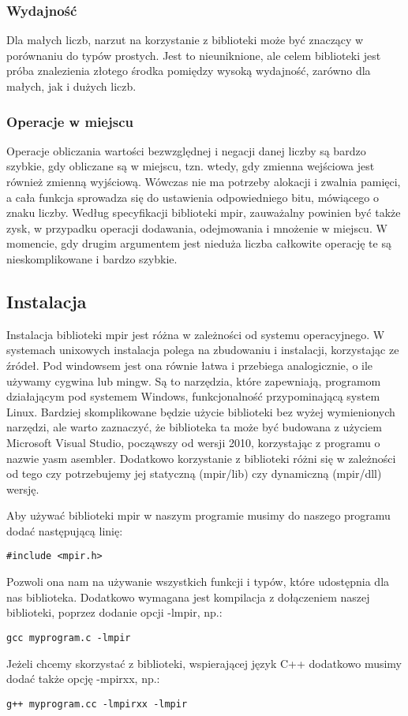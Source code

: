 \documentclass[twoside,a4paper]{book}
\begin{document}
\subsubsection{Wydajność}
Dla małych liczb, narzut na korzystanie z biblioteki może być znaczący w porównaniu do typów prostych. Jest to nieuniknione, ale celem biblioteki jest próba znalezienia złotego środka pomiędzy wysoką wydajność, zarówno dla małych, jak i dużych liczb. 

\subsubsection{Operacje w miejscu}
Operacje obliczania wartości bezwzględnej i negacji danej liczby są bardzo szybkie, gdy obliczane są w miejscu, tzn. wtedy, gdy zmienna wejściowa jest również zmienną wyjściową. Wówczas nie ma potrzeby alokacji i zwalnia pamięci, a cała funkcja sprowadza się do ustawienia odpowiedniego bitu, mówiącego o znaku liczby. Według specyfikacji biblioteki mpir, zauważalny powinien być także zysk, w przypadku operacji dodawania, odejmowania i mnożenie w miejscu. W momencie, gdy drugim argumentem jest nieduża liczba całkowite operację te są nieskomplikowane i bardzo szybkie.

\subsection{Instalacja}

Instalacja biblioteki mpir jest różna w zależności od systemu operacyjnego. W systemach unixowych instalacja polega na zbudowaniu i instalacji, korzystając ze źródeł. Pod windowsem jest ona równie łatwa i przebiega analogicznie, o ile używamy cygwina lub mingw. Są to narzędzia, które zapewniają, programom działającym pod systemem Windows, funkcjonalność przypominającą system Linux. Bardziej skomplikowane będzie użycie biblioteki bez wyżej wymienionych narzędzi, ale warto zaznaczyć, że biblioteka ta może być budowana z użyciem Microsoft Visual Studio, począwszy od wersji 2010, korzystając z programu o nazwie yasm asembler. Dodatkowo korzystanie z biblioteki różni się w zależności od tego czy potrzebujemy jej statyczną (mpir/lib) czy dynamiczną (mpir/dll) wersję.

Aby używać biblioteki mpir w naszym programie musimy do naszego programu dodać następującą linię:
\begin{lstlisting}
#include <mpir.h>
\end{lstlisting}
Pozwoli ona nam na używanie wszystkich funkcji i typów, które udostępnia dla nas biblioteka. Dodatkowo wymagana jest kompilacja z dołączeniem naszej biblioteki, poprzez dodanie opcji -lmpir, np.:
\begin{lstlisting}
gcc myprogram.c -lmpir
\end{lstlisting}
Jeżeli chcemy skorzystać z biblioteki, wspierającej język C++ dodatkowo musimy dodać także opcję -mpirxx, np.:
\begin{lstlisting}
g++ myprogram.cc -lmpirxx -lmpir
\end{lstlisting}
\end{document}
